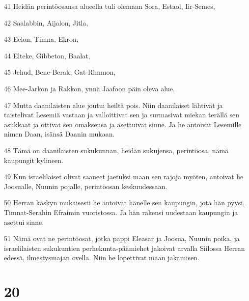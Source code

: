 \par 41 Heidän perintöosansa alueella tuli olemaan Sora, Estaol, Iir-Semes,
\par 42 Saalabbin, Aijalon, Jitla,
\par 43 Eelon, Timna, Ekron,
\par 44 Elteke, Gibbeton, Baalat,
\par 45 Jehud, Bene-Berak, Gat-Rimmon,
\par 46 Mee-Jarkon ja Rakkon, ynnä Jaafoon päin oleva alue.
\par 47 Mutta daanilaisten alue joutui heiltä pois. Niin daanilaiset lähtivät ja taistelivat Lesemiä vastaan ja valloittivat sen ja surmasivat miekan terällä sen asukkaat ja ottivat sen omaksensa ja asettuivat sinne. Ja he antoivat Lesemille nimen Daan, isänsä Daanin mukaan.
\par 48 Tämä on daanilaisten sukukunnan, heidän sukujensa, perintöosa, nämä kaupungit kylineen.
\par 49 Kun israelilaiset olivat saaneet jaetuksi maan sen rajoja myöten, antoivat he Joosualle, Nuunin pojalle, perintöosan keskuudessaan.
\par 50 Herran käskyn mukaisesti he antoivat hänelle sen kaupungin, jota hän pyysi, Timnat-Serahin Efraimin vuoristossa. Ja hän rakensi uudestaan kaupungin ja asettui sinne.
\par 51 Nämä ovat ne perintöosat, jotka pappi Eleasar ja Joosua, Nuunin poika, ja israelilaisten sukukuntien perhekunta-päämiehet jakoivat arvalla Siilossa Herran edessä, ilmestysmajan ovella. Niin he lopettivat maan jakamisen.

\chapter{20}

